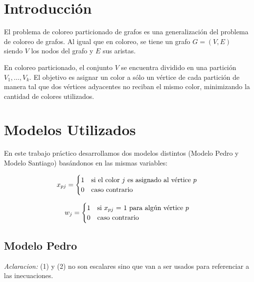 \documentclass[a4paper, 10pt, twoside]{article}
\begin{document}
\newpage

\tableofcontents

\newpage


\section{Introducción}

El problema de coloreo particionado de grafos es una generalización del problema de coloreo de grafos. Al igual que en coloreo, se tiene un grafo $G = (V,E)$ siendo $V$ los nodos del grafo y $E$ sus aristas.

En coloreo particionado, el conjunto $V$ se encuentra dividido en una partición $V_1, \ldots, V_k$. El objetivo es asignar un color a sólo un vértice de cada partición de manera tal que dos vértices adyacentes no reciban el mismo color, minimizando la cantidad de colores utilizados.

\section{Modelos Utilizados}

En este trabajo práctico desarrollamos dos modelos distintos (Modelo Pedro y Modelo Santiago) basándonos en las mismas variables:

\[
 x_{pj} =
  \begin{cases} 
      \hfill 1    \hfill & \text{si el color $j$ es asignado al vértice $p$} \\
      \hfill 0 \hfill & \text{caso contrario} \\
  \end{cases}
\]


\[
 w_j =
  \begin{cases} 
      \hfill 1    \hfill & \text{si $x_{pj}$ = 1 para algún vértice $p$} \\
      \hfill 0 \hfill & \text{caso contrario} \\
  \end{cases}
\]

\subsection{Modelo Pedro}

\textit{Aclaracion:} (1) y (2) no son escalares sino que van a ser usados para referenciar a las inecuaciones.

\label{modelo-pedro}
\end{document}
